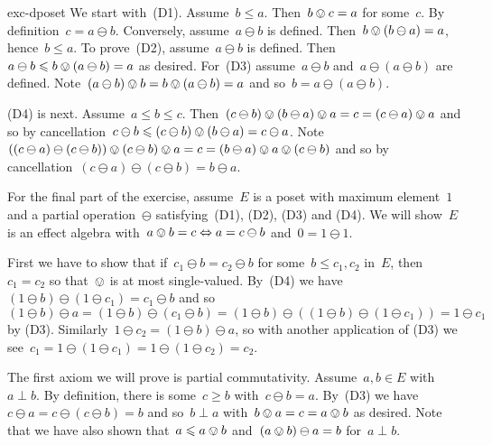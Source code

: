 \begin{solution}{exc-dposet}%
We start with~(D1).  Assume~$b \leq a$. Then~$b \ovee c= a$ for some~$c$.
    By definition~$c = a \ominus b $.
Conversely, assume~$a \ominus b$ is defined.
    Then~$b \ovee (b \ominus a) = a$, hence~$b \leq a$.
To prove~(D2), assume~$a \ominus b$ is defined.
    Then~$a \ominus b \leq b \ovee (a \ominus b) = a$ as desired.
For~(D3) assume~$a \ominus b$ and~$a \ominus (a \ominus b)$
    are defined.
Note~$(a \ominus b) \ovee b = b \ovee (a \ominus b) = a$
    and so~$b = a \ominus (a \ominus b)$.

(D4) is next.  Assume~$a\leq b \leq c$.
    Then~$(c \ominus b) \ovee (b\ominus a)  \ovee a
        = c  =  (c \ominus a) \ovee a$
            and so by cancellation~$
               c \ominus b \leq (c\ominus b) \ovee (b \ominus a)
               = c \ominus a$.
    Note~$ ((c \ominus a) \ominus (c \ominus b))  \ovee (c \ominus b)
        \ovee a = c = (b \ominus a) \ovee a \ovee (c \ominus b)$
    and so by cancellation~$ (c\ominus a) \ominus (c \ominus b) = b\ominus a$.

For the final part of the exercise, assume~$E$ is a poset
    with maximum element~$1$ and a partial operation~$\ominus$
    satisfying~(D1), (D2), (D3) and (D4).
We will show~$E$ is an effect algebra with~$a \ovee b = c \Leftrightarrow
            a = c \ominus b$ and~$0 = 1\ominus 1$.

First we have to show that if~$c_1 \ominus b = c_2 \ominus b$
    for some~$b \leq c_1, c_2$ in~$E$,
    then~$c_1 = c_2$
    so that~$\ovee$ is at most single-valued.
By~(D4)
    we have~$(1 \ominus b) \ominus (1 \ominus c_1)
        = c_1\ominus b$
        and so~$(1 \ominus b) \ominus a =
        (1 \ominus b) \ominus (c_1 \ominus b)
            =  (1\ominus b) \ominus ((1 \ominus b) \ominus (1 \ominus c_1))
            = 1 \ominus c_1$ by (D3).
Similarly~$1 \ominus c_2 = (1 \ominus b) \ominus a$,
        so with another application of (D3) we
        see~$c_1 = 1 \ominus(1\ominus c_1) = 1 \ominus (1 \ominus c_2)
            = c_2$.

The first axiom we will prove is partial commutativity.
    Assume~$a,b \in E$ with~$a \perp b$.
    By definition, there is some~$c\geq b$ with~$c \ominus b = a$.
    By~(D3) we have~$c \ominus a = c \ominus (c \ominus b) = b$
        and so~$b \perp a$
        with~$b \ovee a = c = a\ovee b$ as desired.
Note that we have also shown that~$a \leq a\ovee b$
    and~$(a \ovee b) \ominus a = b$
    for~$a \perp b$.


\end{solution}
